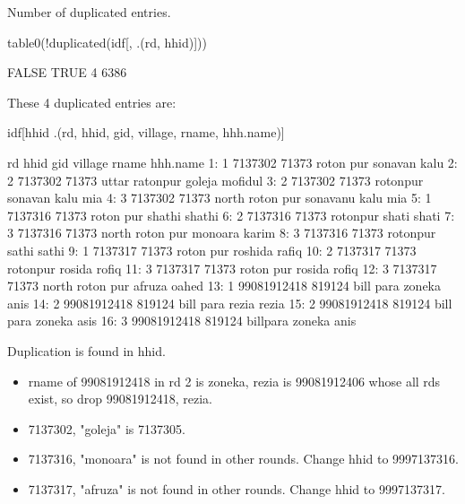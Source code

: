 Number of duplicated entries.
\begin{Schunk}
\begin{Sinput}
table0(!duplicated(idf[, .(rd, hhid)]))
\end{Sinput}
\begin{Soutput}

FALSE  TRUE 
    4  6386 
\end{Soutput}
\end{Schunk}
These 4 duplicated entries are:
\begin{Schunk}
\begin{Sinput}
idf[hhid %in% hhid[duplicated(idf[, .(rd, hhid)])], 
	.(rd, hhid, gid, village, rname, hhh.name)]
\end{Sinput}
\begin{Soutput}
    rd        hhid    gid         village    rname hhh.name
 1:  1     7137302  71373       roton pur  sonavan     kalu
 2:  2     7137302  71373  uttar ratonpur   goleja  mofidul
 3:  2     7137302  71373        rotonpur  sonavan kalu mia
 4:  3     7137302  71373 north roton pur sonavanu kalu mia
 5:  1     7137316  71373       roton pur   shathi   shathi
 6:  2     7137316  71373        rotonpur    shati    shati
 7:  3     7137316  71373 north roton pur  monoara    karim
 8:  3     7137316  71373        rotonpur    sathi    sathi
 9:  1     7137317  71373       roton pur  roshida    rafiq
10:  2     7137317  71373        rotonpur   rosida    rofiq
11:  3     7137317  71373       roton pur   rosida    rofiq
12:  3     7137317  71373 north roton pur   afruza    oahed
13:  1 99081912418 819124       bill para   zoneka     anis
14:  2 99081912418 819124       bill para    rezia    rezia
15:  2 99081912418 819124       bill para   zoneka     asis
16:  3 99081912418 819124        billpara   zoneka     anis
\end{Soutput}
\end{Schunk}
Duplication is found in \textsf{hhid}. 
\begin{itemize}
\vspace{1.0ex}\setlength{\itemsep}{1.0ex}\setlength{\baselineskip}{12pt}
\item	\textsf{rname} of 99081912418 in rd 2 is zoneka, rezia is 99081912406 whose all rds exist, so drop 99081912418, rezia. 
\item	7137302, "goleja" is 7137305. 
\item	7137316, "monoara" is not found in other rounds. Change hhid to 9997137316. 
\item	7137317, "afruza" is not found in other rounds. Change hhid to 9997137317.
\end{itemize}
